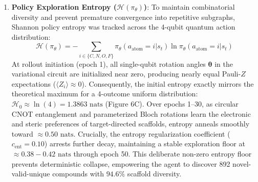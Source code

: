 \documentclass[10pt,a4paper]{article}
\begin{document}
\begin{enumerate}[leftmargin=*]
    \item \textbf{Policy Exploration Entropy ($\mathcal{H}(\pi_\theta)$)}:
    To maintain combinatorial diversity and prevent premature convergence into repetitive subgraphs, Shannon policy entropy was tracked across the 4-qubit quantum action distribution:
    \begin{equation}
    \mathcal{H}(\pi_\theta) = -\sum_{i \in \{C, N, O, F\}} \pi_\theta(a_{\text{atom}} = i | s_t) \ln \pi_\theta(a_{\text{atom}} = i | s_t)
    \end{equation}
    At rollout initiation (epoch 1), all single-qubit rotation angles $\boldsymbol{\theta}$ in the variational circuit are initialized near zero, producing nearly equal Pauli-$Z$ expectations ($\langle Z_i \rangle \approx 0$). Consequently, the initial entropy exactly mirrors the theoretical maximum for a 4-outcome uniform distribution: $\mathcal{H}_0 \approx \ln(4) = 1.3863\text{ nats}$ (Figure 6C). Over epochs 1--30, as circular CNOT entanglement and parameterized Bloch rotations learn the electronic and steric preferences of target-directed scaffolds, entropy anneals smoothly toward $\approx 0.50\text{ nats}$. Crucially, the entropy regularization coefficient ($c_{\text{ent}} = 0.10$) arrests further decay, maintaining a stable exploration floor at $\approx 0.38 - 0.42\text{ nats}$ through epoch 50. This deliberate non-zero entropy floor prevents deterministic collapse, empowering the agent to discover 892 novel-valid-unique compounds with $94.6\%$ scaffold diversity.


\end{enumerate}
\end{document}
